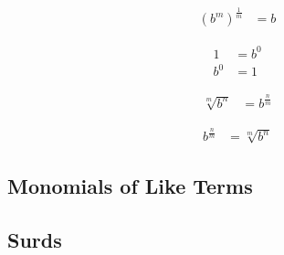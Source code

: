 \documentclass[20150903-160354-rs2.2-MarksMathNotebook.tex]{subfiles}
\begin{document}
\begin{definition}
\begin{subequations}
\begin{align}
\left(b^{m}\right)^{\frac{1}{m}} &= b  \label{eq:poi}
\end{align}
\end{subequations}
\end{definition}

\begin{definition}
\begin{subequations}
\begin{align}
1&= b^0  \label{eq:poid1} \\
b^{0}&= 1  \label{eq:poid2}
\end{align}
\end{subequations}
\end{definition}

\begin{notation}
\begin{align}
\sqrt[m]{b^n} &= b^{\frac{n}{m}}	 \label{eq:rtpo}
\end{align}
\end{notation}

\begin{notation}
\begin{align}
b^{\frac{n}{m}} &= \sqrt[m]{b^n}	 \label{eq:potr}
\end{align}
\end{notation}


\subsection{Monomials of Like Terms}




\subsection{Surds}
\end{document}
